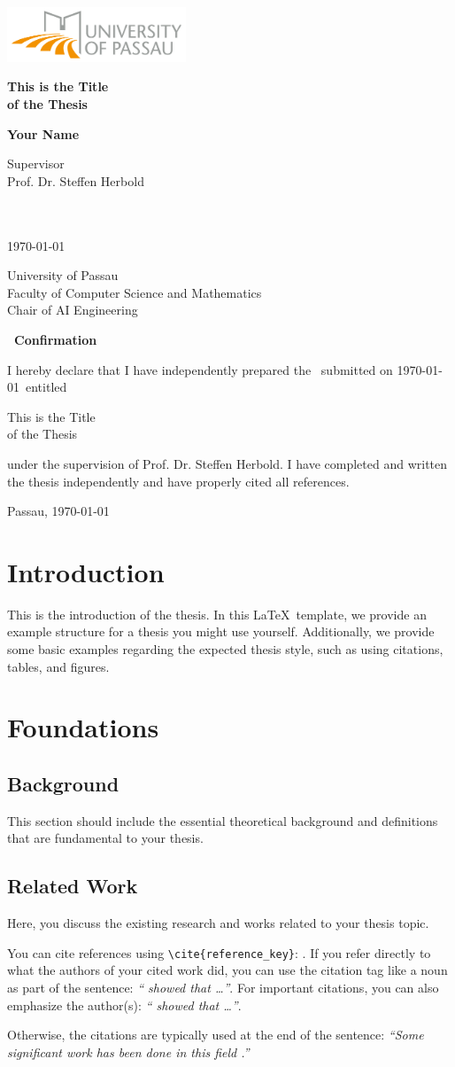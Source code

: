 \documentclass[a4paper,12pt,notitlepage,twoside,openright]{report}
\newcommand{\titlepageformat}{
    \begin{titlepage}
        \newgeometry{left=1in, right=1in, top=1in, bottom=1in} %
        \begin{center}
            \vspace{0.5in}  
         
            \includegraphics[width=0.4\textwidth]{img/logo.png}
            
            \vspace*{0.4in}
    
            \LARGE \thesistype
            \vspace{0.8in}
            
            \Huge \textbf{\thesistitle}
            
            \vspace{0.4in}
            
            \LARGE\textbf{\authorname}
            
            \vspace{1.5in}
            
           \large Supervisor \\
            \LARGE \supervisorname\\
            \supervisornameII\\
            \supervisornameIII
            
            \vfill
            
            \large \submissiondate
            
            \vspace{0.5in}
            
            \universityname \\
            \facultyname \\
            \departmentname
        \end{center}
    \end{titlepage}
}
\newcommand{\confirmation}{
        \cleardoublepage
       \begin{flushleft}
            \textbf{\LARGE\ Confirmation}\\\vspace{0.2in}
           
            I hereby declare that I have independently prepared the \thesistype\ submitted on \submissiondate\ entitled
            \begin{center}
                \thesistitle
            \end{center}
            under the supervision of \supervisorname. I have completed and written the thesis independently and have properly cited all references.
        \end{flushleft}
        \vspace{0.5in}
        Passau, \submissiondate
        \cleardoublepage
}
\newcommand{\thesistitle}{This is the Title \\of the Thesis}
\newcommand{\authorname}{Your Name}
\newcommand{\supervisorname}{Prof. Dr. Steffen Herbold}
\newcommand{\supervisornameII}{\ } %
\newcommand{\supervisornameIII}{\ } %
\newcommand{\submissiondate}{\today}
\newcommand{\universityname}{University of Passau}
\newcommand{\facultyname}{Faculty of Computer Science and Mathematics}
\newcommand{\departmentname}{Chair of AI Engineering}
\begin{document}

\titlepageformat

\confirmation

\begin{abstract}
    This is the abstract of the thesis. It provides a brief summary of the research, including the main findings and conclusions.
\end{abstract}

\tableofcontents
\cleardoublepage
{}

\chapter{Introduction}\label{chp:introduction}
This is the introduction of the thesis. In this \LaTeX\ template, we provide an example structure for a thesis you might use yourself. 
Additionally, we provide some basic examples regarding the expected thesis style, such as using citations, tables, and figures. 


\chapter{Foundations}

\section{Background}\label{sec:background}

This section should include the essential theoretical background and definitions that are fundamental to your thesis.

\section{Related Work}

Here, you discuss the existing research and works related to your thesis topic.

You can cite references using \texttt{\textbackslash cite\{reference\_key\}}: \cite{bert}. If you refer directly to what the authors of your cited work did, you can use the citation tag like a noun as part of the sentence: \emph{“\cite{bert} showed that \dots”}. For important citations, you can also emphasize the author(s): \emph{“\citeauthor{bert} \cite{bert} showed that \dots”}.

Otherwise, the citations are typically used at the end of the sentence: \emph{“Some significant work has been done in this field \cite*{bert}.”}
\end{document}
